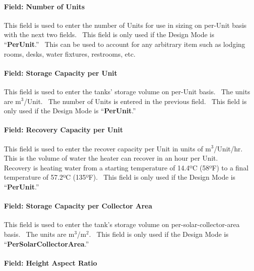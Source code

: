 \paragraph{Field: Number of Units}\label{field-number-of-units-000}

This field is used to enter the number of Units for use in sizing on per-Unit basis with the next two fields.~ This field is only used if the Design Mode is ``\textbf{PerUnit}.''~ This can be used to account for any arbitrary item such as lodging rooms, desks, water fixtures, restrooms, etc.

\paragraph{Field: Storage Capacity per Unit}\label{field-storage-capacity-per-unit}

This field is used to enter the tanks' storage volume on per-Unit basis.~ The units are m\(^{3}\)/Unit.~ The number of Units is entered in the previous field.~ This field is only used if the Design Mode is ``\textbf{PerUnit}.''

\paragraph{Field: Recovery Capacity per Unit}\label{field-recovery-capacity-per-unit}

This field is used to enter the recover capacity per Unit in units of m\(^{3}\)/Unit/hr.~ This is the volume of water the heater can recover in an hour per Unit.~ Recovery is heating water from a starting temperature of 14.4ºC (58ºF) to a final temperature of 57.2ºC (135ºF).~ This field is only used if the Design Mode is ``\textbf{PerUnit}.''

\paragraph{Field: Storage Capacity per Collector Area}\label{field-storage-capacity-per-collector-area}

This field is used to enter the tank's storage volume on per-solar-collector-area basis.~ The units are m\(^{3}\)/m\(^{2}\).~ This field is only used if the Design Mode is ``\textbf{PerSolarCollectorArea}.''

\paragraph{Field: Height Aspect Ratio}\label{field-height-aspect-ratio}

